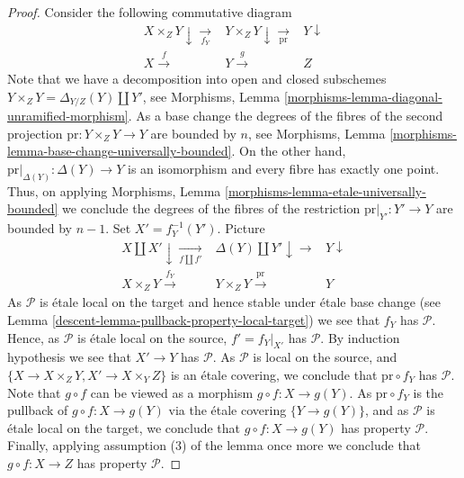\begin{proof}
\medskip\noindent
Consider the following commutative diagram
$$
\begin{array}{ccc}X \times_Z Y \downarrow\underset{f_Y}{\longrightarrow} & Y \times_Z Y \downarrow\underset{\text{pr}}{\longrightarrow} & Y \downarrow \\ X \overset{f}{\longrightarrow} & Y \overset{g}{\longrightarrow} & Z\end{array}
$$
Note that we have a decomposition into open and closed
subschemes $Y \times_Z Y = \Delta_{Y/Z}(Y) \amalg Y'$, see
Morphisms, Lemma \ref{morphisms-lemma-diagonal-unramified-morphism}.
As a base change the degrees of the fibres of the second projection
$\text{pr} : Y \times_Z Y \to Y$ are bounded by $n$, see
Morphisms, Lemma \ref{morphisms-lemma-base-change-universally-bounded}.
On the other hand, $\text{pr}|_{\Delta(Y)} : \Delta(Y) \to Y$ is
an isomorphism and every fibre has exactly one point.
Thus, on applying
Morphisms, Lemma \ref{morphisms-lemma-etale-universally-bounded}
we conclude the degrees of the fibres of the restriction
$\text{pr}|_{Y'} : Y' \to Y$ are bounded by $n - 1$.
Set $X' = f_Y^{-1}(Y')$. Picture
$$
\begin{array}{ccc}X \amalg X' \downarrow\underset{f \amalg f'}{\longrightarrow} & \Delta(Y) \amalg Y' \downarrow\longrightarrow & Y \downarrow \\ X \times_Z Y \overset{f_Y}{\longrightarrow} & Y \times_Z Y \overset{\text{pr}}{\longrightarrow} & Y\end{array}
$$
As $\mathcal{P}$ is \'etale local on the target and hence stable under
\'etale base change (see
Lemma \ref{descent-lemma-pullback-property-local-target})
we see that $f_Y$ has $\mathcal{P}$.
Hence, as $\mathcal{P}$ is \'etale local on the source,
$f' = f_Y|_{X'}$ has $\mathcal{P}$. By induction hypothesis
we see that $X' \to Y$ has $\mathcal{P}$.
As $\mathcal{P}$ is local on the source, and
$\{X \to X \times_Z Y, X' \to X \times_Y Z\}$ is an \'etale covering,
we conclude that $\text{pr} \circ f_Y$ has $\mathcal{P}$.
Note that $g \circ f$ can be viewed as a morphism
$g \circ f : X \to g(Y)$. As $\text{pr} \circ f_Y$ is the pullback of
$g \circ f : X \to g(Y)$ via the \'etale covering $\{Y \to g(Y)\}$,
and as $\mathcal{P}$ is \'etale local on the target, we conclude that
$g \circ f : X \to g(Y)$ has property $\mathcal{P}$. Finally, applying
assumption (3) of the lemma once more we conclude that
$g \circ f : X \to Z$ has property $\mathcal{P}$.
\end{proof}

